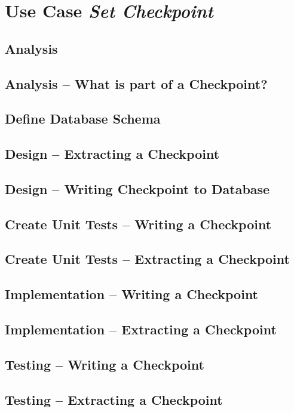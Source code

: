 \documentclass[11pt]{article}
\begin{document}
\section{Use Case \emph{Set Checkpoint}}
\label{sec:orgf161bf9}
\subsection{Analysis}
\label{sec:org823b410}
\subsection{Analysis -- What is part of a Checkpoint?}
\label{sec:orga034cdf}
\subsection{Define Database Schema}
\label{sec:org8a0abc1}
\subsection{Design -- Extracting a Checkpoint}
\label{sec:org75c80ad}
\subsection{Design -- Writing Checkpoint to Database}
\label{sec:orgd3f5698}
\subsection{Create Unit Tests -- Writing a Checkpoint}
\label{sec:org1a8ea45}
\subsection{Create Unit Tests -- Extracting a Checkpoint}
\label{sec:orgcd62640}
\subsection{Implementation -- Writing a Checkpoint}
\label{sec:org475965e}
\subsection{Implementation -- Extracting a Checkpoint}
\label{sec:org31ef7c4}
\subsection{Testing -- Writing a Checkpoint}
\label{sec:orgb5655dc}
\subsection{Testing -- Extracting a Checkpoint}
\label{sec:org4863f33}
\end{document}
